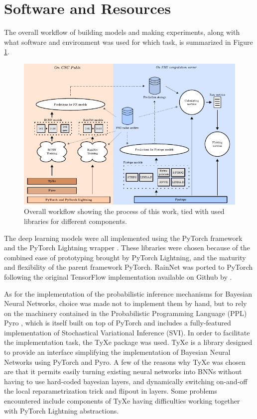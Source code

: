 \section{Software and Resources}

\label{section:software}

The overall workflow of building models and making experiments, along with what software and environment was used for which task, is summarized in Figure \ref{fig:workflow}.

\begin{figure}[ht]
	\centering
	\includegraphics[width=\textwidth]{images/workflow/workflow}
	\caption{Overall workflow showing the process of this work, tied with used libraries for different components.}
	\label{fig:workflow}
\end{figure}

The deep learning models were all implemented using the PyTorch framework and the PyTorch Lightning wrapper \cite{Falcon_PyTorch_Lightning_2019}. These libraries were chosen because of the combined ease of prototyping brought by PyTorch Lightning, and the maturity and flexibility of the parent framework PyTorch. RainNet was ported to PyTorch following the original TensorFlow \cite{abadi_tensorflow_2016} implementation available on Github by \citet{Ayzel2020RainNet}. 

As for the implementation of the probabilistic inference mechanisms for Bayesian Neural Networks, choice was made not to implement them by hand, but to rely on the machinery contained in the Probabilistic Programming Language (PPL) Pyro \cite{bingham2018pyro}, which is itself built on top of PyTorch and includes a fully-featured implementation of Stochastical Variational Inference (SVI). In order to facilitate the implementation task, the TyXe package \cite{ritter2021tyxe} was used. TyXe is a library designed to provide an interface simplifying the implementation of Bayesian Neural Networks using PyTorch and Pyro. A few of the reasons why TyXe was chosen are that it permits easily turning existing neural networks into BNNs without having to use hard-coded bayesian layers, and dynamically switching on-and-off the local reparametrization trick and flipout in layers. Some problems encountered include components of TyXe having difficulties working together with PyTorch Lightning abstractions.

